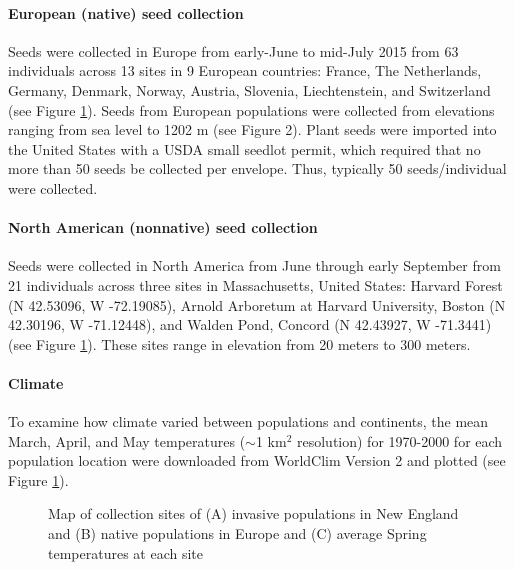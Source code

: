 \documentclass[12pt]{article}\usepackage[]{graphicx}\usepackage[]{color}
\begin{document}
	\paragraph{European (native) seed collection} 
	Seeds were collected in Europe from early-June to mid-July 2015 from 63 individuals across 13 sites in 9 European countries: France, The Netherlands, Germany, Denmark, Norway, Austria, Slovenia, Liechtenstein, and Switzerland (see Figure \ref{fig:sites}). Seeds from European populations were collected from elevations ranging from sea level  to 1202 m (see Figure 2). Plant seeds were imported into the United States with a USDA small seedlot permit, which required that no more than 50 seeds be collected per envelope. Thus, typically 50 seeds/individual were collected. 
	
   \paragraph{North American (nonnative) seed collection} Seeds were collected in North America from June through early September from 21 individuals across three sites in Massachusetts, United States:  Harvard Forest (N 42.53096, W -72.19085), Arnold Arboretum at Harvard University, Boston (N 42.30196, W -71.12448), and Walden Pond, Concord (N 42.43927, W -71.3441) (see Figure \ref{fig:sites}). These sites range in elevation from 20 meters to 300 meters. 
	
	\paragraph{Climate}
	To examine how climate varied between populations and continents, the mean March, April, and May temperatures ($\sim$1 km$^2$ resolution) for 1970-2000 for each population location were downloaded from WorldClim Version 2 \parencite{Fick2017}  and plotted (see Figure \ref{fig:sites}). 
	
	
	\begin{figure}
		\centering
		\caption{Map of collection sites of (A) invasive populations in New England and (B) native populations in Europe and (C) average Spring temperatures at each site}
		\label{fig:sites}
	\end{figure}
\end{document}
